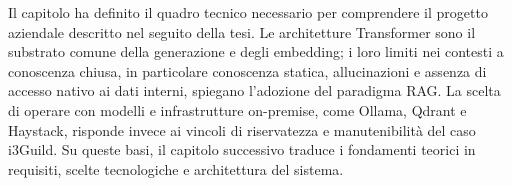 Il capitolo ha definito il quadro tecnico necessario per comprendere il progetto
aziendale descritto nel seguito della tesi. Le architetture Transformer sono il
substrato comune della generazione e degli embedding; i loro limiti nei contesti
a conoscenza chiusa, in particolare conoscenza statica, allucinazioni e assenza
di accesso nativo ai dati interni, spiegano l'adozione del paradigma RAG. La
scelta di operare con modelli e infrastrutture on-premise, come Ollama, Qdrant
e Haystack, risponde invece ai vincoli di riservatezza e manutenibilità del caso
i3Guild. Su queste basi, il capitolo successivo traduce i fondamenti teorici in
requisiti, scelte tecnologiche e architettura del sistema.
